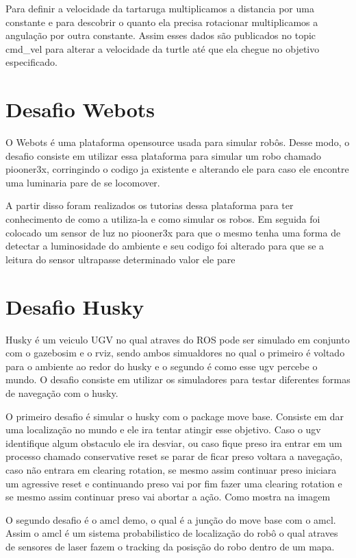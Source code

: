 Para definir a velocidade da tartaruga multiplicamos a distancia por uma constante e
para descobrir o quanto ela precisa rotacionar multiplicamos a 
angulação por outra constante. Assim esses dados são publicados no topic
cmd\_vel para alterar a velocidade da turtle até que ela chegue no objetivo
especificado.

\section{Desafio Webots}

O Webots é uma plataforma opensource usada para simular robôs. 
Desse modo, o desafio consiste em utilizar essa plataforma para 
simular um robo chamado piooner3x, corringindo o codigo ja existente
e alterando ele para caso ele encontre uma luminaria pare de se locomover.

A partir disso foram realizados os tutorias dessa plataforma para 
ter conhecimento de como a utiliza-la e como simular os robos. 
Em seguida foi colocado um sensor de luz no piooner3x para que 
o mesmo tenha uma forma de detectar a luminosidade do ambiente
e seu codigo foi alterado para que se a leitura do sensor 
ultrapasse determinado valor ele pare


\section{Desafio Husky}
Husky é um veiculo UGV no qual atraves do ROS pode ser 
simulado em conjunto com o gazebosim e o rviz, sendo ambos
simualdores no qual o primeiro é voltado para o ambiente 
ao redor do husky e o segundo é como esse ugv percebe o mundo.
O desafio consiste em utilizar os simuladores para testar
diferentes formas de navegação com o husky.

O primeiro desafio é simular o husky com o package move base. 
Consiste em dar uma localização no mundo e ele ira tentar atingir 
esse objetivo. Caso o ugv identifique algum obstaculo ele ira desviar,
ou caso fique preso ira entrar em um processo chamado conservative reset
se parar de ficar preso voltara a navegação, caso não entrara em 
clearing rotation, se mesmo assim continuar preso iniciara um agressive reset
e continuando preso vai por fim fazer uma clearing rotation e se mesmo 
assim continuar preso vai abortar a ação. Como mostra na imagem


O segundo desafio é o amcl demo, o qual é a junção do move base com o
amcl. Assim o amcl é um sistema probabilistico de localização do robô
o qual atraves de sensores de laser fazem o tracking da posisção do 
robo dentro de um mapa.

